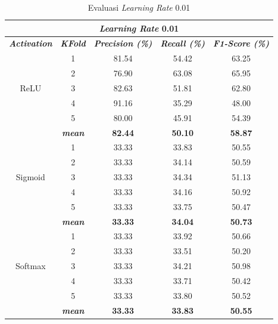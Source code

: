         \begin{table}[H]
        \centering
        \caption{Evaluasi \textit{Learning Rate} 0.01}
        \begin{tabular}{ccccc}
            \toprule
            \multicolumn{5}{c}{\textit{Learning Rate} 0.01} \\ \hline
            
            \textbf{\textit{Activation}} & \multicolumn{1}{c}{\textbf{\textit{KFold}}} & \textbf{\textit{Precision (\%)} } & \textbf{\textit{Recall (\%)}} & \textbf{\textit{F1-Score (\%)}}  \\
    
            \midrule
            \multirow{5}{*}{ReLU} 

            & 1 & 81.54 & 54.42 & 63.25  \\
            & 2 & 76.90 & 63.08 & 65.95 \\
            & 3 & 82.63 & 51.81 & 62.80\\
            & 4 & 91.16 & 35.29 & 48.00\\
            & 5 & 80.00 & 45.91 & 54.39 \\ 
            & \textbf{\textit{mean}}& \textbf{82.44} & \textbf{50.10} & \textbf{58.87} \\ \hline
            
            \multirow{5}{*}{Sigmoid}
            & 1 &  33.33 & 33.83 & 50.55  \\
            & 2 &  33.33  & 34.14 & 50.59 \\
            & 3 &  33.33  & 34.34 & 51.13 \\
            & 4 &  33.33  & 34.16 & 50.92 \\
            & 5 &  33.33  & 33.75 & 50.47 \\
            & \textit{\textbf{mean}}& \textbf{33.33} & \textbf{34.04} &\textbf{50.73} \\ 
                        \hline
    
            \multirow{5}{*}{Softmax}
            & 1 & 33.33  & 33.92 & 50.66 \\
            & 2 & 33.33  & 33.51 & 50.20 \\
            & 3 & 33.33  & 34.21 & 50.98  \\
            & 4 & 33.33  & 33.71 & 50.42 \\
            & 5 & 33.33  & 33.80 & 50.52 \\
            & \textit{\textbf{mean}}& \textbf{33.33} & \textbf{33.83} &\textbf{50.55} \\ 
    

            \bottomrule
        \end{tabular}
        \label{Evaluasi Learning Rate 0.01 }
    \end{table}

